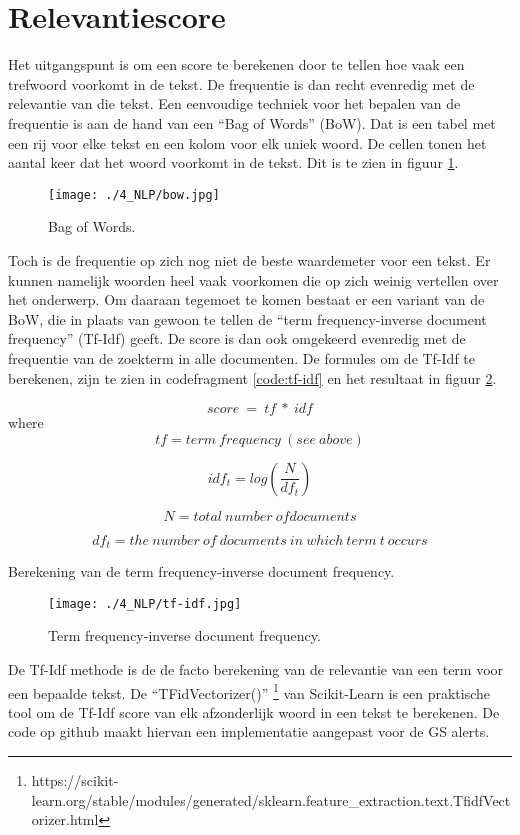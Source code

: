 \section{Relevantiescore}
Het uitgangspunt is om een score te berekenen door te tellen hoe vaak een trefwoord voorkomt in de tekst. De frequentie is dan recht evenredig met de relevantie van die tekst. Een eenvoudige techniek voor het bepalen van de frequentie is aan de hand van een ``Bag of Words'' (BoW). Dat is een tabel met een rij voor elke tekst en een kolom voor elk uniek woord. De cellen tonen het aantal keer dat het woord voorkomt in de tekst.  Dit is te zien in figuur \ref{fig:bow}.
\begin{figure}[h!]
    \centering
    \texttt{[image: ./4\_NLP/bow.jpg]}
    \caption[Bag of Words.]{\label{fig:bow}Bag of Words.}
\end{figure}
Toch is de frequentie op zich nog niet de beste waardemeter voor een tekst. Er kunnen namelijk woorden heel vaak voorkomen die op zich weinig vertellen over het onderwerp. Om daaraan tegemoet te komen bestaat er een variant van de BoW, die in plaats van gewoon te tellen de ``term frequency-inverse document frequency'' (Tf-Idf) geeft. De score is dan ook omgekeerd evenredig met de frequentie van de zoekterm in alle documenten. De formules om de Tf-Idf te berekenen, zijn te zien in codefragment \ref{code:tf-idf} en het resultaat in figuur \ref{fig:tf-idf}.
\begin{listing}[h!]
    \[
        score\ =\ tf\ \ast\ idf
    \]  
    where
    \[
        tf=term\ frequency\ \left(see\ above\right)
    \] 
    
    \[
        idf_t=log\left(\frac{N}{df_t}\right)
    \]  
    
    \[ 
        N=total\ number\ ofdocuments
    \]  
    
    \[ 
        df_t=the\ number\ of\ documents\ in\ which\ term\ t\ occurs
    \] 
     
    \caption[term frequency-inverse document frequency]{Berekening van de term frequency-inverse document frequency.}
    \label{code:tf-idf}
\end{listing}
\begin{figure}[h!]
    \centering
    \texttt{[image: ./4\_NLP/tf-idf.jpg]}
    \caption[term frequency-inverse document frequency.]{\label{fig:tf-idf}Term frequency-inverse document frequency.}
\end{figure}
De Tf-Idf methode is de de facto berekening van de relevantie van een term voor een bepaalde tekst. De ``TFidVectorizer()'' \footnote{https://scikit-learn.org/stable/modules/generated/sklearn.feature\_extraction.text.TfidfVectorizer.html} van Scikit-Learn is een praktische tool om de Tf-Idf score van elk afzonderlijk woord in een tekst te berekenen. De code op github \textcite{Depaepenlp2025} maakt hiervan een implementatie aangepast voor de GS alerts.
